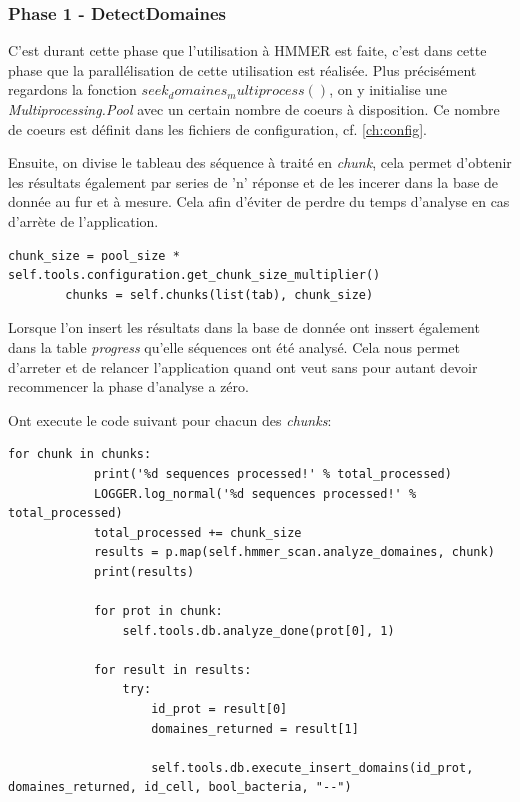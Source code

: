 \subsubsection{Phase 1 - DetectDomaines}

C'est durant cette phase que l'utilisation à HMMER est faite, c'est dans cette phase que la parallélisation de cette utilisation est réalisée. Plus précisément regardons la fonction \emph{$seek_domaines_multiprocess()$}, on y initialise une \emph{Multiprocessing.Pool} avec un certain nombre de coeurs à disposition. Ce nombre de coeurs est définit dans les fichiers de configuration, cf. \ref{ch:config}.

Ensuite, on divise le tableau des séquence à traité en \emph{chunk}, cela permet d'obtenir les résultats également par series de 'n' réponse et de les incerer dans la base de donnée au fur et à mesure. Cela afin d'éviter de perdre du temps d'analyse en cas d'arrète de l'application.

\lstset{language=python}
\begin{lstlisting}[frame=single]
chunk_size = pool_size * self.tools.configuration.get_chunk_size_multiplier()
        chunks = self.chunks(list(tab), chunk_size)
\end{lstlisting} 

Lorsque l'on insert les résultats dans la base de donnée ont inssert également dans la table \emph{progress} qu'elle séquences ont été analysé. Cela nous permet d'arreter et de relancer l'application quand ont veut sans pour autant devoir recommencer la phase d'analyse a zéro.

Ont execute le code suivant pour chacun des \emph{chunks}:
\begin{lstlisting}[frame=single]
for chunk in chunks:
            print('%d sequences processed!' % total_processed)
            LOGGER.log_normal('%d sequences processed!' % total_processed)
            total_processed += chunk_size
            results = p.map(self.hmmer_scan.analyze_domaines, chunk)
            print(results)

            for prot in chunk:
                self.tools.db.analyze_done(prot[0], 1)

            for result in results:
                try:
                    id_prot = result[0]
                    domaines_returned = result[1]

                    self.tools.db.execute_insert_domains(id_prot, domaines_returned, id_cell, bool_bacteria, "--")
\end{lstlisting} 

